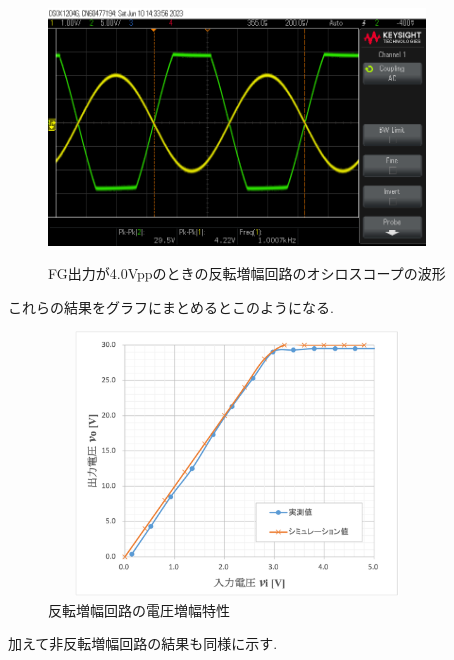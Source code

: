 \documentclass[a4j,10pt,dvipdfmx]{jarticle}
\begin{document}
\begin{figure}[H]
  \begin{center}
  \includegraphics[height=7cm,width=10cm]{4Vpp.png}
  \caption{FG出力が4.0Vppのときの反転増幅回路のオシロスコープの波形}
\end{center}
\end{figure}
これらの結果をグラフにまとめるとこのようになる.
\begin{figure}[H]
  \begin{center}
  \includegraphics[height=7cm,width=10cm]{hantengurafu.png}
  \caption{反転増幅回路の電圧増幅特性}
\end{center}
\end{figure}

加えて非反転増幅回路の結果も同様に示す.
\end{document}
